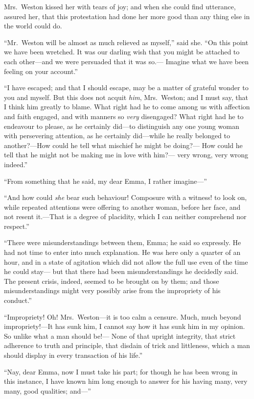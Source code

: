Mrs.\ Weston kissed her with tears of joy; and when she could
find utterance, assured her, that this protestation had done
her more good than any thing else in the world could do.

``Mr.\ Weston will be almost as much relieved as myself,'' said she.
``On this point we have been wretched.  It was our darling wish that you
might be attached to each other---and we were persuaded that it was so.---%
Imagine what we have been feeling on your account.''

``I have escaped; and that I should escape, may be a matter of
grateful wonder to you and myself.  But this does not acquit \emph{him},
Mrs.\ Weston; and I must say, that I think him greatly to blame.
What right had he to come among us with affection and faith engaged,
and with manners so \emph{very} disengaged?  What right had he to endeavour
to please, as he certainly did---to distinguish any one young woman with
persevering attention, as he certainly did---while he really belonged
to another?---How could he tell what mischief he might be doing?---%
How could he tell that he might not be making me in love with him?---%
very wrong, very wrong indeed.''

``From something that he said, my dear Emma, I rather imagine---''

``And how could \emph{she} bear such behaviour!  Composure with a witness!
to look on, while repeated attentions were offering to another woman,
before her face, and not resent it.---That is a degree of placidity,
which I can neither comprehend nor respect.''

``There were misunderstandings between them, Emma; he said
so expressly.  He had not time to enter into much explanation.
He was here only a quarter of an hour, and in a state of agitation
which did not allow the full use even of the time he could stay---%
but that there had been misunderstandings he decidedly said.
The present crisis, indeed, seemed to be brought on by them;
and those misunderstandings might very possibly arise from the
impropriety of his conduct.''

``Impropriety!  Oh!  Mrs.\ Weston---it is too calm a censure.
Much, much beyond impropriety!---It has sunk him, I cannot say how
it has sunk him in my opinion.  So unlike what a man should be!---%
None of that upright integrity, that strict adherence to truth
and principle, that disdain of trick and littleness, which a man
should display in every transaction of his life.''

``Nay, dear Emma, now I must take his part; for though he has been
wrong in this instance, I have known him long enough to answer
for his having many, very many, good qualities; and---''

